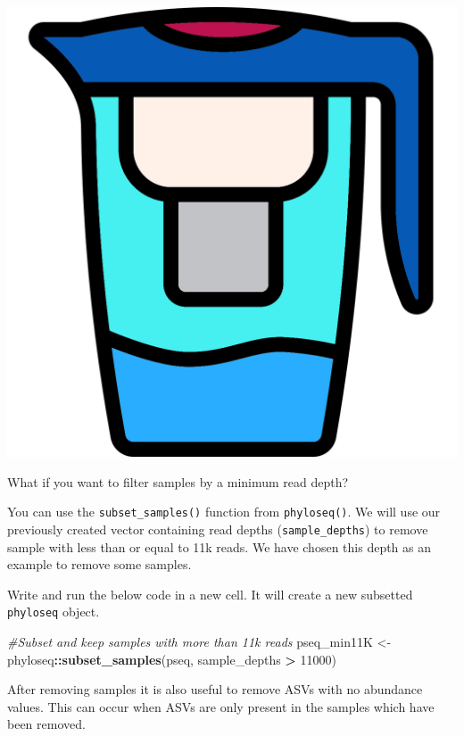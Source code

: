 \documentclass[
]{book}
\newenvironment{Shaded}{\begin{snugshade}}{\end{snugshade}}
\newcommand{\CommentTok}[1]{\textcolor[rgb]{0.56,0.35,0.01}{\textit{#1}}}
\newcommand{\DecValTok}[1]{\textcolor[rgb]{0.00,0.00,0.81}{#1}}
\newcommand{\FunctionTok}[1]{\textcolor[rgb]{0.13,0.29,0.53}{\textbf{#1}}}
\newcommand{\NormalTok}[1]{#1}
\newcommand{\OtherTok}[1]{\textcolor[rgb]{0.56,0.35,0.01}{#1}}
\newcommand{\SpecialCharTok}[1]{\textcolor[rgb]{0.81,0.36,0.00}{\textbf{#1}}}
\begin{document}
\includegraphics{figures/water_filter.png}

What if you want to filter samples by a minimum read depth?

You can use the \texttt{subset\_samples()} function from \texttt{phyloseq()}.
We will use our previously created vector containing read depths (\texttt{sample\_depths}) to remove sample with less than or equal to 11k reads.
We have chosen this depth as an example to remove some samples.

Write and run the below code in a new cell.
It will create a new subsetted \texttt{phyloseq} object.

\begin{Shaded}
\begin{Highlighting}[]
\CommentTok{\#Subset and keep samples with more than 11k reads}
\NormalTok{pseq\_min11K }\OtherTok{\textless{}{-}}\NormalTok{ phyloseq}\SpecialCharTok{::}\FunctionTok{subset\_samples}\NormalTok{(pseq, sample\_depths }\SpecialCharTok{\textgreater{}} \DecValTok{11000}\NormalTok{)}
\end{Highlighting}
\end{Shaded}

After removing samples it is also useful to remove ASVs with no abundance values.
This can occur when ASVs are only present in the samples which have been removed.
\end{document}
